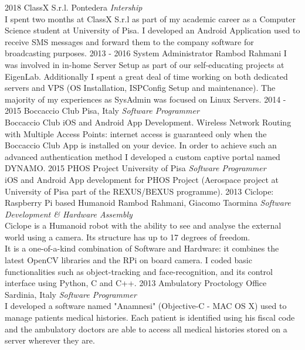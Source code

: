 \documentclass[]{friggeri-cv}
\begin{document}
\begin{entrylist}
\entry
{2018}
{ClassX S.r.l.}
{Pontedera}
{\emph{Intership} \\
I spent two months at ClassX S.r.l as part of my academic career as a Computer Science student at University of Pisa. I developed an Android Application used to receive SMS messages and forward them to the company software for broadcasting purposes.}
\entry
{2013 - 2016}
{System Administrator}
{Rambod Rahmani}
{I was involved in in-home Server Setup as part of our self-educating projects at EigenLab. Additionally I spent a great deal of time working on both dedicated servers and VPS (OS Installation, ISPConfig Setup and maintenance). The majority of my experiences as SysAdmin was focused on Linux Servers.}
\entry
{2014 - 2015}
{Boccaccio Club}
{Pisa, Italy}
{\emph{Software Programmer} \\
Boccaccio Club iOS and Android App Development. Wireless Network Routing with Multiple Access Points: internet access is guaranteed only when the Boccaccio Club App is installed on your device. In order to achieve such an advanced authentication method I developed a custom captive portal named DYNAMO.}
\entry
{2015}
{PHOS Project}
{University of Pisa}
{\emph{Software Programmer} \\
iOS and Android App development for PHOS Project (Aerospace project at University of Pisa part of the REXUS/BEXUS programme).}
\entry
{2013}
{Ciclope: Raspberry Pi based Humanoid}
{Rambod Rahmani, Giacomo Taormina}
{\emph{Software Development \& Hardware Assembly} \\
Ciclope is a Humanoid robot with the ability to see and analyse the external world using a camera. Its structure has up to 17 degrees of freedom.\\
It is a one-of-a-kind combination of Software and Hardware: it combines the latest OpenCV libraries and the RPi on board camera. I coded basic functionalities such as object-tracking and face-recognition, and its control interface using Python, C and C++.}
\entry
{2013}
{Ambulatory Proctology Office}
{Sardinia, Italy}
{\emph{Software Programmer} \\
I developed a software named "Anamnesi" (Objective-C - MAC OS X) used to manage patients medical histories. Each patient is identified using his fiscal code and the ambulatory doctors are able to access all medical histories stored on a server wherever they are.}

\end{entrylist}
\end{document}
